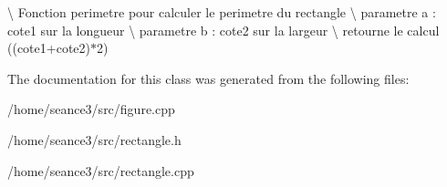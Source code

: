 \textbackslash{} Fonction perimetre pour calculer le perimetre du rectangle \textbackslash{} parametre a \+: cote1 sur la longueur \textbackslash{} parametre b \+: cote2 sur la largeur \textbackslash{} retourne le calcul ((cote1+cote2)$\ast$2) 

The documentation for this class was generated from the following files\+:\begin{DoxyCompactItemize}
\item 
/home/seance3/src/figure.\+cpp\item 
/home/seance3/src/rectangle.\+h\item 
/home/seance3/src/rectangle.\+cpp\end{DoxyCompactItemize}
